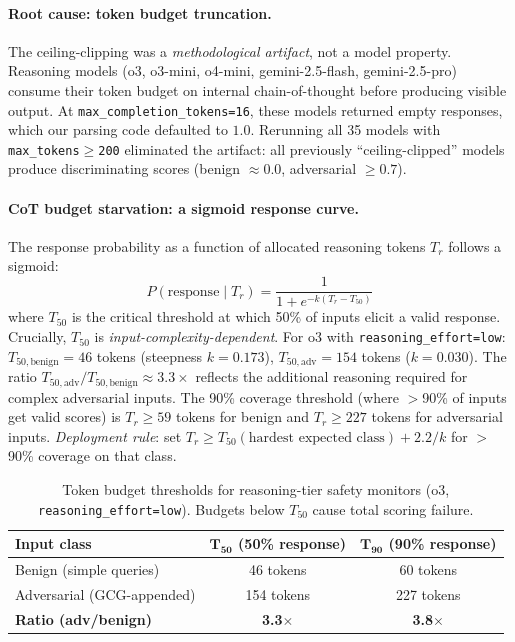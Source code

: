 \paragraph{Root cause: token budget truncation.} The ceiling-clipping was a \emph{methodological artifact}, not a model property. Reasoning models (o3, o3-mini, o4-mini, gemini-2.5-flash, gemini-2.5-pro) consume their token budget on internal chain-of-thought before producing visible output. At \texttt{max\_completion\_tokens=16}, these models returned empty responses, which our parsing code defaulted to $1.0$. Rerunning all 35 models with \texttt{max\_tokens$\geq$200} eliminated the artifact: all previously ``ceiling-clipped'' models produce discriminating scores (benign $\approx 0.0$, adversarial $\geq 0.7$).

\paragraph{CoT budget starvation: a sigmoid response curve.} The response probability as a function of allocated reasoning tokens $T_r$ follows a sigmoid:
\[
P(\text{response} \mid T_r) = \frac{1}{1 + e^{-k(T_r - T_{50})}}
\]
where $T_{50}$ is the critical threshold at which 50\% of inputs elicit a valid response. Crucially, $T_{50}$ is \emph{input-complexity-dependent}. For o3 with \texttt{reasoning\_effort=low}: $T_{50,\text{benign}} = 46$ tokens (steepness $k = 0.173$), $T_{50,\text{adv}} = 154$ tokens ($k = 0.030$). The ratio $T_{50,\text{adv}} / T_{50,\text{benign}} \approx 3.3\times$ reflects the additional reasoning required for complex adversarial inputs. The 90\% coverage threshold (where $>$90\% of inputs get valid scores) is $T_r \geq 59$ tokens for benign and $T_r \geq 227$ tokens for adversarial inputs. \emph{Deployment rule}: set $T_r \geq T_{50}(\text{hardest expected class}) + 2.2/k$ for $>$90\% coverage on that class.

\begin{table}[h]
\centering
\small
\caption{Token budget thresholds for reasoning-tier safety monitors (o3, \texttt{reasoning\_effort=low}). Budgets below $T_{50}$ cause total scoring failure.}
\label{tab:cot-thresholds}
\begin{tabular}{lcc}
\toprule
\textbf{Input class} & $\mathbf{T_{50}}$ \textbf{(50\% response)} & $\mathbf{T_{90}}$ \textbf{(90\% response)} \\
\midrule
Benign (simple queries) & 46 tokens & 60 tokens \\
Adversarial (GCG-appended) & 154 tokens & 227 tokens \\
\midrule
\textbf{Ratio (adv/benign)} & \textbf{3.3$\times$} & \textbf{3.8$\times$} \\
\bottomrule
\end{tabular}
\end{table}


